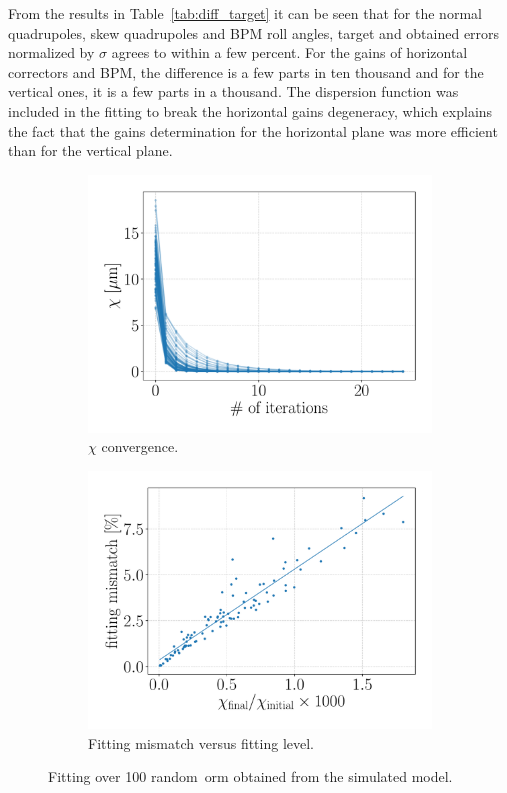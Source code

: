 From the results in Table~\ref{tab:diff_target} it can be seen that for the normal quadrupoles, skew quadrupoles and BPM roll angles, target and obtained errors normalized by $\sigma$ agrees to within a few percent. For the gains of horizontal correctors and BPM, the difference is a few parts in ten thousand and for the vertical ones, it is a few parts in a thousand. The dispersion function was included in the fitting to break the horizontal gains degeneracy, which explains the fact that the gains determination for the horizontal plane was more efficient than for the vertical plane.
\begin{figure}
\centering
\begin{subfigure}[t]{0.49\textwidth}
\includegraphics[width=1.0\textwidth]{figures/chi_seeds_grid_big.pdf}
    \caption{$\chi$ convergence.}
    \label{subfig:chi_seeds}
\end{subfigure}
 \begin{subfigure}[t]{0.49\textwidth}
\includegraphics[width=1.0\textwidth]{figures/chi_versus_score_grid_big.pdf}
    \caption{Fitting mismatch versus fitting level.}
    \label{subfig:chi_versus_score}
\end{subfigure}
\caption{Fitting over 100 random~\gls{orm} obtained from the simulated model.}
\label{fig:fitting_seeds}
\end{figure}
